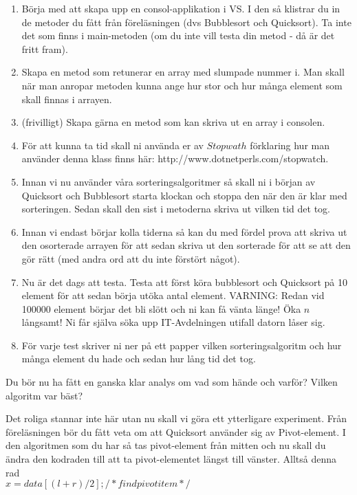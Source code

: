 \documentclass{article}
\begin{document}
\begin{enumerate}
\item Börja med att skapa upp en consol-applikation i VS. I den så klistrar du in de metoder du fått från föreläsningen (dvs Bubblesort och Quicksort). Ta inte det som finns i main-metoden (om du inte vill testa din metod - då är det fritt fram).
\item Skapa en metod som retunerar en array med slumpade nummer i. Man skall när man anropar metoden kunna ange hur stor och hur många element som skall finnas i arrayen. 
\item (frivilligt) Skapa gärna en metod som kan skriva ut en array i consolen. 
\item För att kunna ta tid skall ni använda er av $Stopwath$ förklaring hur man använder denna klass finns här: http://www.dotnetperls.com/stopwatch.
\item Innan vi nu använder våra sorteringsalgoritmer så skall ni i början av Quicksort och Bubblesort starta klockan och stoppa den när den är klar med sorteringen. Sedan skall den sist i metoderna skriva ut vilken tid det tog.
\item Innan vi endast börjar kolla tiderna så kan du med fördel prova att skriva ut den osorterade arrayen för att sedan skriva ut den sorterade för att se att den gör rätt (med andra ord att du inte förstört något).
\item Nu är det dags att testa. Testa att först köra bubblesort och Quicksort på 10 element för att sedan börja utöka antal element. VARNING: Redan vid 100000 element börjar det bli slött och ni kan få vänta länge! Öka $n$ långsamt! Ni får själva söka upp IT-Avdelningen utifall datorn låser sig.
\item För varje test skriver ni ner på ett papper vilken sorteringsalgoritm och hur många element du hade och sedan hur lång tid det tog.
\end{enumerate}

Du bör nu ha fått en ganska klar analys om vad som hände och varför? Vilken algoritm var bäst? 

Det roliga stannar inte här utan nu skall vi göra ett ytterligare experiment. Från föreläsningen bör du fått veta om att Quicksort använder sig av Pivot-element. I den algoritmen som du har så tas pivot-element från mitten och nu skall du ändra den kodraden till att ta pivot-elementet längst till vänster. Alltså denna rad\\

$x = data[(l + r) / 2]; /* find pivot item */$ \\
\end{document}
